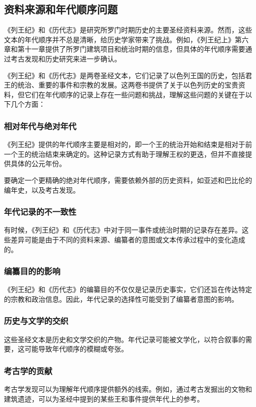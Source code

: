 \documentclass[12pt, a4paper]{ctexart}
\begin{document}
\subsection{资料来源和年代顺序问题}
《列王纪》和《历代志》是研究所罗门时期历史的主要圣经资料来源。然而，这些文本的年代顺序并不总是清晰，给历史学家带来了挑战。例如，《列王纪上》第六章和第十一章提供了所罗门建筑项目和统治时期的信息，但具体的年代顺序需要通过考古发现和历史研究来进一步确认。

《列王纪》和《历代志》是两卷圣经文本，它们记录了以色列王国的历史，包括君王的统治、重要的事件和宗教的发展。这两卷书提供了关于以色列历史的宝贵资料，但它们在年代顺序的记录上存在一些问题和挑战，理解这些问题的关键在于以下几个方面：

\subsubsection{相对年代与绝对年代}
《列王纪》提供的年代顺序主要是相对的，即一个王的统治开始和结束是相对于前一个王的统治结束来确定的。这种记录方式有助于理解王权的更迭，但并不直接提供具体的公元年份。

要确定一个更精确的绝对年代顺序，需要依赖外部的历史资料，如亚述和巴比伦的编年史，以及考古发现。

\subsubsection{年代记录的不一致性}
有时候，《列王纪》和《历代志》中对于同一事件或统治时期的记录存在差异。这些差异可能是由于不同的资料来源、编纂者的意图或文本传承过程中的变化造成的。

\subsubsection{编纂目的的影响}
《列王纪》和《历代志》的编纂目的不仅仅是记录历史事实，它们还旨在传达特定的宗教和政治信息。因此，年代记录的选择性可能受到了编纂者意图的影响。

\subsubsection{历史与文学的交织}
这些圣经文本是历史和文学交织的产物。年代记录可能被文学化，以符合叙事的需要，这可能导致年代顺序的模糊或夸张。

\subsubsection{考古学的贡献}
考古学发现可以为理解年代顺序提供额外的线索。例如，通过考古发掘出的文物和建筑遗迹，可以为圣经中提到的某些王和事件提供年代上的参考。
\end{document}
